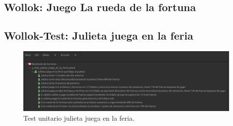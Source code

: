 \documentclass[11pt,a4paper]{article}
\begin{document}
\subsection{Wollok: Juego La rueda de la fortuna}


\subsection{Wollok-Test: Julieta juega en la feria}


\begin{figure}[H]
	\centering
	\includegraphics[scale=0.4]{figuras/test_julieta_juega_en_la_feria.png}
    \caption{Test unitario julieta juega en la feria.}
    \label{fig:test julieta juega en la feria}
\end{figure}  


\newpage

\appendix


%
%
\end{document}
